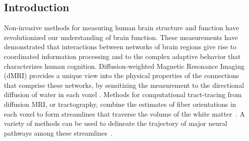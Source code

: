 \documentclass[10pt,%
               aps,%
               prl,%
               reprint,%
               superscriptaddress,%
               preprintnumbers,%
               linenumbers,%
               amsmath,%
               floatfix]{revtex4-1}
\begin{document}
\maketitle

\subsection*{Introduction}

Non-invasive methods for measuring human brain structure and function have
revolutionized our understanding of brain function. These measurements
have demonstrated that interactions between networks of brain regions give rise
to coordinated information processing and to the complex adaptive behavior that
characterizes human cognition. Diffusion-weighted Magnetic Resonance Imaging
(dMRI) provides a unique view into the physical properties of the connections
that comprise these networks, by sensitizing the measurement to the directional
diffusion of water in each voxel \cite{wandell2016clarifying}.
Methods for computational tract-tracing from diffusion MRI, or tractography,
combine the estimates of fiber orientations in each voxel to form streamlines
that traverse the volume of the white matter~\cite{Conturo1999-je,
Mori2002-qi}. A variety of methods can be used to delineate the
trajectory of major neural pathways among these
streamlines~\cite{yeatman2012tract}.
\end{document}
